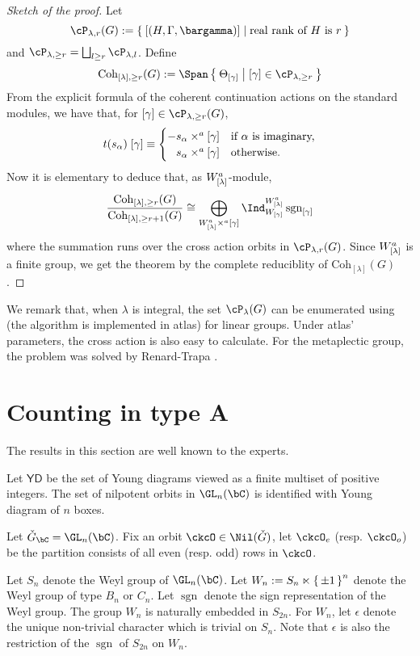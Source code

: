 \documentclass[12pt,a4paper]{amsart}
\newcommand{\sgn}{\operatorname{sgn}}
\numberwithin{equation}{section}
\theoremstyle{remark}
\def\ckG{\check{G}}
\def\ckGc{\check{G}_{\bC}}
\def\YD{\mathsf{YD}}
\def\Coh{\mathrm{Coh}}
\begin{document}
\begin{proof}[Sketch of the proof]
 Let
 \[
   \cP_{\lambda,r}(G):= \Set{[(H,\Gamma,\bargamma)]|
     \text{real rank of $H$ is $r$}}
 \]
 and $\cP_{\lambda,\geq r} = \bigsqcup_{l\geq r}\cP_{\lambda,l}$. Define
 \[
   \Coh_{[\lambda],\geq r}(G) :=
   \Span\Set{\Theta_{[\gamma]}|[\gamma]\in \cP_{\lambda,\geq r}}
 \]
 From the explicit formula of the coherent continuation actions on the standard
 modules, we have that, for $[\gamma]\in \cP_{\lambda,\geq r}(G)$,
 \[
   t(s_{\alpha})\; [\gamma]
   \equiv
   \begin{cases}
     - s_{\alpha}\times^a [\gamma] & \text{if $\alpha$ is imaginary,}\\
     \phantom{-} s_{\alpha}\times^a [\gamma] & \text{otherwise.}
   \end{cases}
 \]
 Now it is elementary to deduce that, as $W^a_{[\lambda]}$-module,
 \[
   \frac{\Coh_{[\lambda],\geq r}(G)}{\Coh_{[\lambda],\geq r+1}(G)}
   \cong \bigoplus_{\Wlama \crossa [\gamma]}
   \Ind_{W_{[\gamma]}}^{\Wlama} \sgn_{[\gamma]}
 \]
 where the summation runs over the cross action orbits
 in $\cP_{\lambda,r}(G)$.
 Since $W^a_{[\lambda]}$ is a finite group, we get the theorem by the complete
 reduciblity of $\Coh_{[\lambda]}(G)$.
\end{proof}

We remark that, when $\lambda$ is integral, the set $\cP_{\lambda}(G)$ can be enumerated using \cite{AC} (the
algorithm is implemented in atlas) for linear groups.
Under atlas' parameters, the cross action is also easy to calculate.
For the metaplectic group, the problem was solved by Renard-Trapa \cite{RT1,RT2}.



\section{Counting in type A}
The results in this section are well known to the experts.


Let $\YD$ be the set of Young diagrams viewed as a finite multiset of positive
integers. The set of nilpotent orbits in $\GL_n(\bC)$ is identified with Young
diagram of $n$ boxes.


Let $\ckGc = \GL_n(\bC)$. 
Fix
an orbit $\ckcO\in \Nil(\ckG)$, let $\ckcO_e$ (resp. $\ckcO_o$) be the partition
consists of all even (resp. odd) rows in $\ckcO$.

Let $S_n$ denote the Weyl group of $\GL_n(\bC)$.
Let $W_n := S_n \ltimes \set{\pm 1}^n$ denote the Weyl group of type $B_n$ or $C_n$.  
Let $\sgn$ denote the sign representation of the Weyl group. 
The group $W_n$ is naturally embedded in $S_{2n}$.
For $W_n$, let $\epsilon$ denote the unique non-trivial character which is trivial on $S_n$. 
Note that $\epsilon$ is also the restriction of the $\sgn$ of $S_{2n}$ on $W_n$. 
\end{document}
